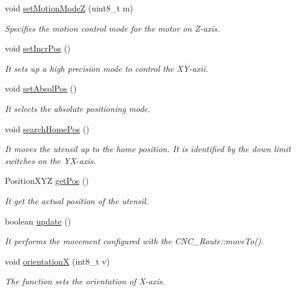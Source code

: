 \begin{DoxyCompactItemize}
void \hyperlink{class_c_n_c___router_a28ddb2544290798664f99ed506f7d44a}{set\+Motion\+Mode\+Z} (uint8\+\_\+t m)
\begin{DoxyCompactList}\small\item\em Specifies the motion control mode for the motor on Z-\/axis. \end{DoxyCompactList}\item 
void \hyperlink{class_c_n_c___router_abbda24db494dd328382639412570978e}{set\+Incr\+Pos} ()
\begin{DoxyCompactList}\small\item\em It sets up a high precision mode to control the X\+Y-\/axii. \end{DoxyCompactList}\item 
void \hyperlink{class_c_n_c___router_a8629d6232f16d039ff386b0f02d45895}{set\+Absol\+Pos} ()
\begin{DoxyCompactList}\small\item\em It selects the absolute positioning mode. \end{DoxyCompactList}\item 
void \hyperlink{class_c_n_c___router_a4e9504d77eee555ddb35af073b67d3f1}{search\+Home\+Pos} ()
\begin{DoxyCompactList}\small\item\em It moves the utensil up to the home position. It is identified by the down limit switches on the Y\+X-\/axis. \end{DoxyCompactList}\item 
Position\+X\+Y\+Z \hyperlink{class_c_n_c___router_a0fce19a7adf29dc0fb2b1a29c813b953}{get\+Pos} ()
\begin{DoxyCompactList}\small\item\em It get the actual position of the utensil. \end{DoxyCompactList}\item 
boolean \hyperlink{class_c_n_c___router_a3a8982d9582e2144d38791626b3060e6}{update} ()
\begin{DoxyCompactList}\small\item\em It performs the movement configured with the C\+N\+C\+\_\+\+Route\+::move\+To(). \end{DoxyCompactList}\item 
void \hyperlink{class_c_n_c___router_adef23983c5aac16fa0431f861eb41fc2}{orientation\+X} (int8\+\_\+t v)
\begin{DoxyCompactList}\small\item\em The function sets the orientation of X-\/axis. \end{DoxyCompactList}\item 

\end{DoxyCompactItemize}
